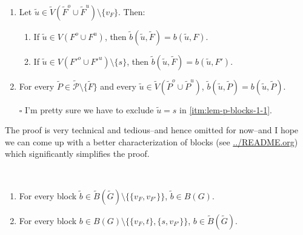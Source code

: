\documentclass[fontsize=11pt,paper=a4]{book}
\begin{document}
\begin{lem}
~
\begin{enumerate}
\item \label{itm:lem-p-blocks-1}
Let \(\tilde{u}\in\tilde{V}(\tilde{F}^o\cup\tilde{F}^u)\setminus\{v_F\}\). Then:

\begin{enumerate}
\item \label{itm:lem-p-blocks-1-1}
If \(\tilde{u}\in V(F^o\cup F^u)\), then \(\tilde{b}(\tilde{u},\tilde{F})=b(\tilde{u},F)\).

\item \label{itm:lem-p-blocks-1-2}
If \(\tilde{u}\in V(F'^o\cup F'^u)\setminus\{s\}\), then \(\tilde{b}(\tilde{u},\tilde{F})=b(\tilde{u},F')\).
\end{enumerate}

\item \label{itm:lem-p-blocks-2}
For every \(\tilde{P}\in\tilde{\mathcal{P}}\setminus\{\tilde{F}\}\) and every \(\tilde{u}\in\tilde{V}(\tilde{P}^o\cup\tilde{P}^u)\), \(\tilde{b}(\tilde{u},\tilde{P})=b(\tilde{u},\tilde{P})\).
\end{enumerate}
\label{orgb0275d3}
\end{lem}

\begin{itemize}
\item[{$\square$}] I'm pretty sure we have to exclude \(\tilde{u}=s\) in \ref{itm:lem-p-blocks-1-1}.
\end{itemize}

\begin{remark}
The proof is very technical and tedious--and hence omitted for now--and I hope we can come up with a better characterization of blocks (see \url{../README.org}) which significantly simplifies the proof.
\end{remark}

\begin{corollary}
~
\begin{enumerate}
\item \label{itm:corollary-p-blocks-1}
For every block \(\tilde{b}\in\tilde{B}(\tilde{G})\setminus\{\{v_F,v_{F'}\}\}\), \(\tilde{b}\in B(G)\).

\item \label{itm:corollary-p-blocks-2}
For every block \(b\in B(G)\setminus\{\{v_F,t\},\{s,v_{F'}\}\}\), \(b\in\tilde{B}(\tilde{G})\).
\end{enumerate}
\label{org5b45dbb}
\end{corollary}
\end{document}
